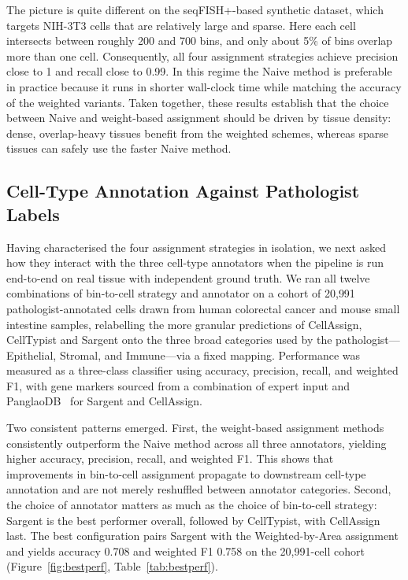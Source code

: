 \documentclass[11pt]{article}
\begin{document}
The picture is quite different on the seqFISH+-based synthetic dataset, which targets NIH-3T3 cells that are relatively large and sparse. Here each cell intersects between roughly 200 and 700 bins, and only about 5\% of bins overlap more than one cell. Consequently, all four assignment strategies achieve precision close to 1 and recall close to 0.99. In this regime the Naive method is preferable in practice because it runs in shorter wall-clock time while matching the accuracy of the weighted variants. Taken together, these results establish that the choice between Naive and weight-based assignment should be driven by tissue density: dense, overlap-heavy tissues benefit from the weighted schemes, whereas sparse tissues can safely use the faster Naive method.

\subsection{Cell-Type Annotation Against Pathologist Labels}

Having characterised the four assignment strategies in isolation, we next asked how they interact with the three cell-type annotators when the pipeline is run end-to-end on real tissue with independent ground truth. We ran all twelve combinations of bin-to-cell strategy and annotator on a cohort of 20{,}991 pathologist-annotated cells drawn from human colorectal cancer and mouse small intestine samples, relabelling the more granular predictions of CellAssign, CellTypist and Sargent onto the three broad categories used by the pathologist---Epithelial, Stromal, and Immune---via a fixed mapping. Performance was measured as a three-class classifier using accuracy, precision, recall, and weighted F1, with gene markers sourced from a combination of expert input and PanglaoDB~\cite{franzen2019panglaodb} for Sargent and CellAssign.

Two consistent patterns emerged. First, the weight-based assignment methods consistently outperform the Naive method across all three annotators, yielding higher accuracy, precision, recall, and weighted F1. This shows that improvements in bin-to-cell assignment propagate to downstream cell-type annotation and are not merely reshuffled between annotator categories. Second, the choice of annotator matters as much as the choice of bin-to-cell strategy: Sargent is the best performer overall, followed by CellTypist, with CellAssign last. The best configuration pairs Sargent with the Weighted-by-Area assignment and yields accuracy 0.708 and weighted F1 0.758 on the 20{,}991-cell cohort (Figure~\ref{fig:bestperf}, Table~\ref{tab:bestperf}).
\end{document}
